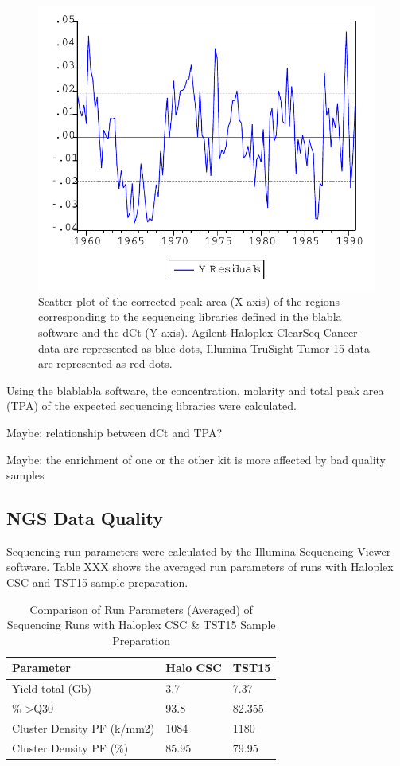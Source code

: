\begin{figure}[!htbp]
  \begin{center}
    \includegraphics[scale=0.75,angle=0]{graph.pdf}
    \caption{Scatter plot of the corrected peak area (X axis) of the regions corresponding to the sequencing libraries defined in the blabla software and the dCt (Y axis). Agilent Haloplex ClearSeq Cancer data are represented as blue dots, Illumina TruSight Tumor 15 data are represented as red dots.}
  \end{center}
\end{figure}

Using the blablabla software, the concentration, molarity and total peak area (TPA)
of the expected sequencing libraries were calculated.

Maybe: relationship between dCt and TPA?

Maybe: the enrichment of one or the other kit is more affected by bad quality samples

\subsection{NGS Data Quality}

Sequencing run parameters were calculated by the Illumina Sequencing Viewer software.
Table XXX shows the averaged run parameters of runs with Haloplex CSC and TST15
sample preparation.

\begin{table}[!htbp]
    \caption[ISV]{Comparison of Run Parameters (Averaged) of Sequencing Runs with Haloplex CSC \& TST15 Sample Preparation}
    \centering
    \begin{tabular}{ |p{4.5cm}|p{1.5cm}|p{1.5cm}|}
    \hline
    Parameter & Halo CSC & TST15 \\ \hline \hline
    Yield total (Gb) & 3.7 & 7.37 \\
    \% \textgreater Q30 & 93.8 & 82.355 \\
    Cluster Density PF (k/mm2) & 1084 & 1180  \\
    Cluster Density PF (\%) & 85.95 & 79.95
    \hline
  \end{tabular}
\end{table}

